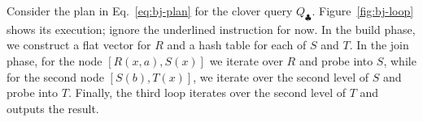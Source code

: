 
\begin{example}\label{ex:binary-free-join}
  Consider the plan in Eq.~\eqref{eq:bj-plan} for the clover query $Q_\clubsuit$.
  Figure~\ref{fig:bj-loop} shows its execution; ignore the underlined
  instruction for now.
  In the build phase,
  we construct a flat vector for $R$ and a hash table for each of $S$ and $T$.
  In the join phase, for the  node $[R(x, a), S(x)]$  we
  iterate over $R$ and probe into $S$, while for the second node $[S(b), T(x)]$,
  we iterate over the second level of $S$ and probe into $T$.
  Finally, the third loop iterates over the second level of $T$ and outputs the result.
\end{example}

